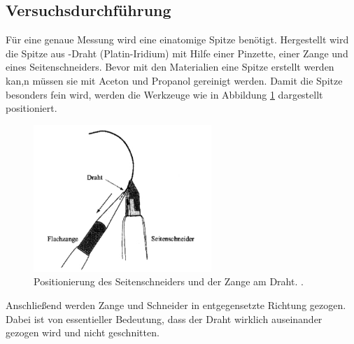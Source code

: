 \subsection{Versuchsdurchführung}

Für eine genaue Messung wird eine einatomige Spitze benötigt.
Hergestellt wird die Spitze aus -Draht (Platin-Iridium)
mit Hilfe einer Pinzette, einer Zange und eines Seitenschneiders.
Bevor mit den Materialien eine Spitze erstellt werden kan,n müssen sie mit Aceton und Propanol gereinigt werden. %
Damit die Spitze besonders fein wird, werden die Werkzeuge wie in Abbildung \ref{fig: zange_schneider}
dargestellt positioniert.
\begin{figure}[!h]
  \centering
  \includegraphics[width=0.6\textwidth]{./pics/herstellung_spitze.png}
  \caption{Positionierung des Seitenschneiders und der Zange am Draht. \cite{anleitung_frankfurt}.}
  \label{fig: zange_schneider}
\end{figure}
Anschließend werden Zange und Schneider in entgegensetzte Richtung gezogen.
Dabei ist von essentieller Bedeutung, dass der Draht wirklich auseinander gezogen wird und
nicht geschnitten.

